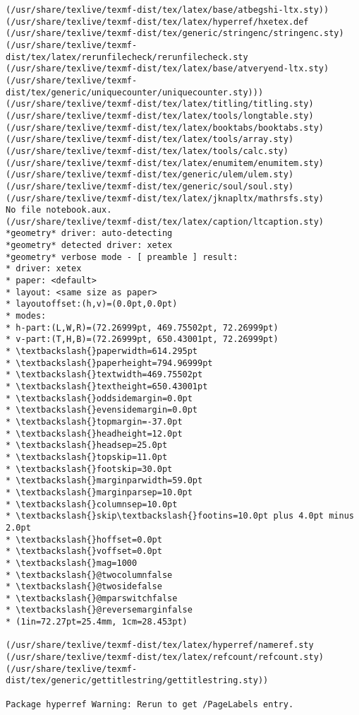 \documentclass[11pt]{article}
\begin{document}
\begin{Verbatim}[commandchars=\\\{\}]
(/usr/share/texlive/texmf-dist/tex/latex/base/atbegshi-ltx.sty))
(/usr/share/texlive/texmf-dist/tex/latex/hyperref/hxetex.def
(/usr/share/texlive/texmf-dist/tex/generic/stringenc/stringenc.sty)
(/usr/share/texlive/texmf-dist/tex/latex/rerunfilecheck/rerunfilecheck.sty
(/usr/share/texlive/texmf-dist/tex/latex/base/atveryend-ltx.sty)
(/usr/share/texlive/texmf-dist/tex/generic/uniquecounter/uniquecounter.sty)))
(/usr/share/texlive/texmf-dist/tex/latex/titling/titling.sty)
(/usr/share/texlive/texmf-dist/tex/latex/tools/longtable.sty)
(/usr/share/texlive/texmf-dist/tex/latex/booktabs/booktabs.sty)
(/usr/share/texlive/texmf-dist/tex/latex/tools/array.sty)
(/usr/share/texlive/texmf-dist/tex/latex/tools/calc.sty)
(/usr/share/texlive/texmf-dist/tex/latex/enumitem/enumitem.sty)
(/usr/share/texlive/texmf-dist/tex/generic/ulem/ulem.sty)
(/usr/share/texlive/texmf-dist/tex/generic/soul/soul.sty)
(/usr/share/texlive/texmf-dist/tex/latex/jknapltx/mathrsfs.sty)
No file notebook.aux.
(/usr/share/texlive/texmf-dist/tex/latex/caption/ltcaption.sty)
*geometry* driver: auto-detecting
*geometry* detected driver: xetex
*geometry* verbose mode - [ preamble ] result:
* driver: xetex
* paper: <default>
* layout: <same size as paper>
* layoutoffset:(h,v)=(0.0pt,0.0pt)
* modes:
* h-part:(L,W,R)=(72.26999pt, 469.75502pt, 72.26999pt)
* v-part:(T,H,B)=(72.26999pt, 650.43001pt, 72.26999pt)
* \textbackslash{}paperwidth=614.295pt
* \textbackslash{}paperheight=794.96999pt
* \textbackslash{}textwidth=469.75502pt
* \textbackslash{}textheight=650.43001pt
* \textbackslash{}oddsidemargin=0.0pt
* \textbackslash{}evensidemargin=0.0pt
* \textbackslash{}topmargin=-37.0pt
* \textbackslash{}headheight=12.0pt
* \textbackslash{}headsep=25.0pt
* \textbackslash{}topskip=11.0pt
* \textbackslash{}footskip=30.0pt
* \textbackslash{}marginparwidth=59.0pt
* \textbackslash{}marginparsep=10.0pt
* \textbackslash{}columnsep=10.0pt
* \textbackslash{}skip\textbackslash{}footins=10.0pt plus 4.0pt minus 2.0pt
* \textbackslash{}hoffset=0.0pt
* \textbackslash{}voffset=0.0pt
* \textbackslash{}mag=1000
* \textbackslash{}@twocolumnfalse
* \textbackslash{}@twosidefalse
* \textbackslash{}@mparswitchfalse
* \textbackslash{}@reversemarginfalse
* (1in=72.27pt=25.4mm, 1cm=28.453pt)

(/usr/share/texlive/texmf-dist/tex/latex/hyperref/nameref.sty
(/usr/share/texlive/texmf-dist/tex/latex/refcount/refcount.sty)
(/usr/share/texlive/texmf-dist/tex/generic/gettitlestring/gettitlestring.sty))

Package hyperref Warning: Rerun to get /PageLabels entry.


\end{Verbatim}
\end{document}
